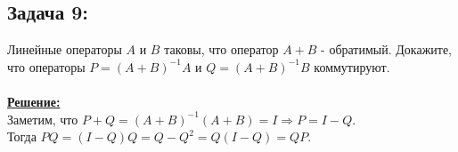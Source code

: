 \documentclass[a4paper,12pt,titlepage,final]{article}
\begin{document}
\subsection*{Задача 9:}
\noindent Линейные операторы $A$ и $B$ таковы, что оператор $A + B$ - обратимый. Докажите, что операторы
$P = (A + B)^{-1}A$ и $Q = (A + B)^{-1}B$ коммутируют. \\ \\
\textbf{\underline{Решение:}} \\
Заметим, что $P + Q = (A + B)^{-1}(A + B) = I \Rightarrow P = I - Q$. \\
Тогда $PQ = (I - Q)Q = Q - Q^2 = Q(I - Q) = QP$. \\ \\ \\ 


\end{document}
